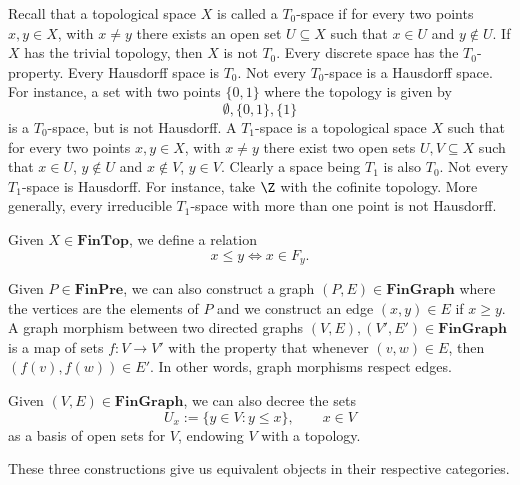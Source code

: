 Recall that a topological space $X$ is called a $T_0$-space if for every two
points $x,y \in X$, with $x \neq y$ there exists an open set $U \subseteq X$
such that $x \in U$ and $y \not\in U$. If $X$ has the trivial topology, then
$X$ is not $T_0$. Every discrete space has the $T_0$-property. Every
Hausdorff space is $T_0$. Not every $T_0$-space is a Hausdorff space.
For instance, a set with two points $\{0,1\}$ where the topology is given
by
\[ \emptyset, \{0,1\}, \{1\} \]
is a $T_0$-space, but is not Hausdorff.
A $T_1$-space is a topological space $X$ such that for every two points
$x,y \in X$, with $x \neq y$ there exist two open sets $U,V \subseteq X$ such
that $x \in U$, $y \not\in U$ and $x \not\in V$, $y \in V$. Clearly a space
being $T_1$ is also $T_0$. Not every $T_1$-space is Hausdorff. For instance,
take $\Z$ with the cofinite topology. More generally, every irreducible
$T_1$-space with more than one point is not Hausdorff.
\begin{definition}
	Given $X \in \mathbf{FinTop}$, we define a relation
	\[ x \leq y \iff x \in F_y. \]
\end{definition}

Given $P \in \mathbf{FinPre}$, we can also construct a graph 
$(P,E) \in \mathbf{FinGraph}$ where the vertices are the elements of $P$
and we construct an edge $(x,y) \in E$ if $x \geq y$. A graph morphism
between two directed graphs $(V,E),(V',E') \in \mathbf{FinGraph}$ is a map
of sets $f : V \to V'$ with the property that whenever $(v,w) \in E$, then
$(f(v),f(w)) \in E'$. In other words, graph morphisms respect edges.

Given $(V,E) \in \mathbf{FinGraph}$, we can also decree the sets
\[ U_x := \{ y \in V : y \leq x \}, \qquad x \in V \]
as a basis of open sets for $V$, endowing $V$ with a topology.

These three constructions give us equivalent objects in their respective
categories.

